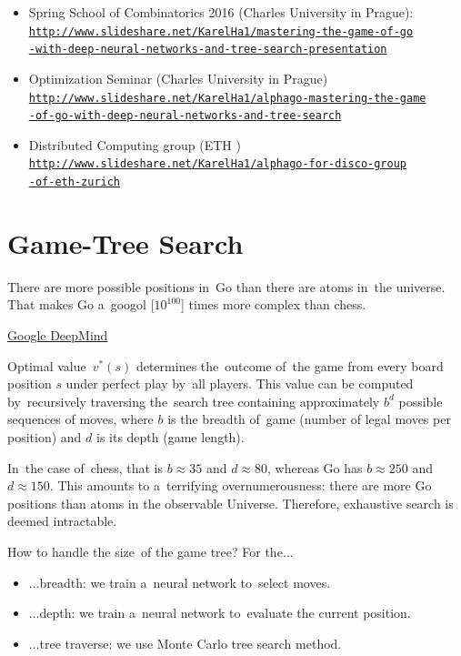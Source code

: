 \begin{itemize}
  \item Spring School of Combinatorics 2016 (Charles University in Prague): \\
    \href{http://www.slideshare.net/KarelHa1/mastering-the-game-of-go-with-deep-neural-networks-and-tree-search-presentation}
    {\tt http://www.slideshare.net/KarelHa1/mastering-the-game-of-go\\-with-deep-neural-networks-and-tree-search-presentation}

  \item Optimization Seminar (Charles University in Prague) \\
    \href{http://www.slideshare.net/KarelHa1/alphago-mastering-the-game-of-go-with-deep-neural-networks-and-tree-search}
    {\tt http://www.slideshare.net/KarelHa1/alphago-mastering-the-game\\-of-go-with-deep-neural-networks-and-tree-search}

  \item Distributed Computing group (ETH \Zurich) \\
    \href{http://www.slideshare.net/KarelHa1/alphago-for-disco-group-of-eth-zurich}
    {\tt http://www.slideshare.net/KarelHa1/alphago-for-disco-group\\-of-eth-zurich}
\end{itemize}

\section{Game-Tree Search}
\epigraph{
  There are more possible positions in~Go than there are atoms in~the universe.
  That makes Go a~googol [$10^{100}$] times more complex than chess.
}{\href{https://deepmind.com/alpha-go.html}{Google DeepMind}}
Optimal value~$v^*(s)$ determines the~outcome of~the game from every board position $s$ under perfect play by~all players.
This value can be computed by~recursively traversing the~search tree containing approximately $b^d$ possible sequences of moves, where $b$ is the breadth of~game (number of legal moves per position) and $d$ is its depth (game length).

In~the case of~chess, that is $b \approx 35$ and $d \approx 80$, whereas Go has $b \approx 250$ and $d \approx 150$.
This amounts to a~terrifying overnumerousness: there are more Go positions than atoms in the observable Universe.
Therefore, exhaustive search is deemed intractable.

How to handle the size~of the game tree? For the$\dots$
\begin{itemize}
  \item $\dots$breadth: we train a~neural network to~select moves.
  \item $\dots$depth: we train a~neural network to~evaluate the current position.
  \item $\dots$tree traverse: we use Monte Carlo tree search method.
\end{itemize}

